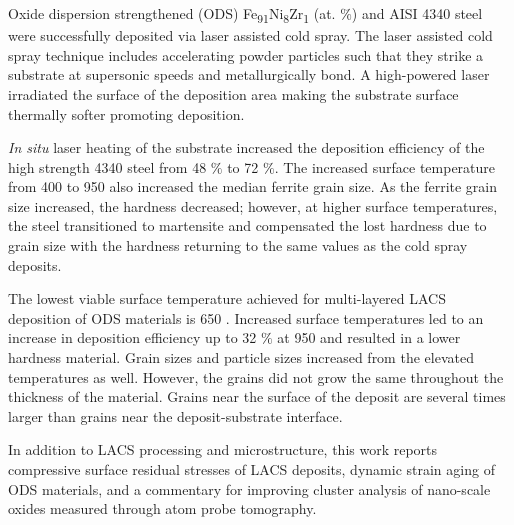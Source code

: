 Oxide dispersion strengthened (ODS) Fe\textsubscript{91}Ni\textsubscript{8}Zr\textsubscript{1} (at. $\%$) and AISI 4340 steel were successfully deposited via laser assisted cold spray. The laser assisted cold spray technique includes accelerating powder particles such that they strike a substrate at supersonic speeds and metallurgically bond. A high-powered laser irradiated the surface of the deposition area making the substrate surface thermally softer promoting deposition.

\textit{In situ} laser heating of the substrate increased the deposition efficiency of the high strength 4340 steel from 48 $\%$  to 72 $\%$. The increased surface temperature from 400 \celsius{} to 950 \celsius{} also increased the median ferrite grain size. As the ferrite grain size increased, the hardness decreased; however, at higher surface temperatures, the steel transitioned to martensite and compensated the lost hardness due to grain size with the hardness returning to the same values as the cold spray deposits. 

The lowest viable surface temperature achieved for multi-layered LACS deposition of ODS materials is 650 \celsius{}. Increased surface temperatures led to an increase in deposition efficiency up to 32 $\%$ at 950 \celsius{} and resulted in a lower hardness material. Grain sizes and particle sizes increased from the elevated temperatures as well. However, the grains did not grow the same throughout the thickness of the material. Grains near the surface of the deposit are several times larger than grains near the deposit-substrate interface.

In addition to LACS processing and microstructure, this work reports compressive surface residual stresses of LACS deposits, dynamic strain aging of ODS materials, and a commentary for improving cluster analysis of nano-scale oxides measured through atom probe tomography.
   
